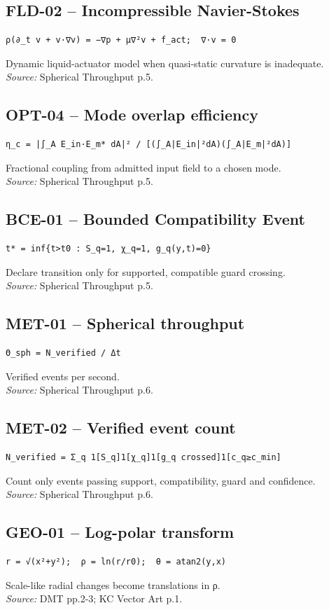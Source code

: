 \documentclass{article}
\begin{document}
\subsection*{FLD-02 -- Incompressible Navier-Stokes}
\begin{verbatim}
ρ(∂_t v + v·∇v) = −∇p + μ∇²v + f_act;  ∇·v = 0
\end{verbatim}
Dynamic liquid-actuator model when quasi-static curvature is inadequate.\\
\textit{Source:} Spherical Throughput p.5.
\subsection*{OPT-04 -- Mode overlap efficiency}
\begin{verbatim}
η_c = |∫_A E_in·E_m* dA|² / [(∫_A|E_in|²dA)(∫_A|E_m|²dA)]
\end{verbatim}
Fractional coupling from admitted input field to a chosen mode.\\
\textit{Source:} Spherical Throughput p.5.
\subsection*{BCE-01 -- Bounded Compatibility Event}
\begin{verbatim}
t* = inf{t>t0 : S_q=1, χ_q=1, g_q(y,t)=0}
\end{verbatim}
Declare transition only for supported, compatible guard crossing.\\
\textit{Source:} Spherical Throughput p.5.
\subsection*{MET-01 -- Spherical throughput}
\begin{verbatim}
Θ_sph = N_verified / Δt
\end{verbatim}
Verified events per second.\\
\textit{Source:} Spherical Throughput p.6.
\subsection*{MET-02 -- Verified event count}
\begin{verbatim}
N_verified = Σ_q 1[S_q]1[χ_q]1[g_q crossed]1[c_q≥c_min]
\end{verbatim}
Count only events passing support, compatibility, guard and confidence.\\
\textit{Source:} Spherical Throughput p.6.
\subsection*{GEO-01 -- Log-polar transform}
\begin{verbatim}
r = √(x²+y²);  ρ = ln(r/r0);  θ = atan2(y,x)
\end{verbatim}
Scale-like radial changes become translations in ρ.\\
\textit{Source:} DMT pp.2-3; KC Vector Art p.1.
\end{document}
